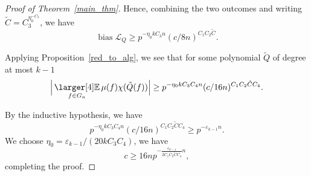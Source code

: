 \documentclass[a4paper,11pt]{article}
\theoremstyle{definition}
\newcommand{\on}[1]{
	\operatorname{#1}
}
\newcommand{\exx}{
  \mathop{
    \mathchoice{\vcenter{\hbox{\larger[4]$\mathbb{E}$}}}
               {\kern0pt\mathbb{E}}
               {\kern0pt\mathbb{E}}
               {\kern0pt\mathbb{E}}
  }\displaylimits
}
\begin{document}
\begin{proof}[Proof of Theorem~\ref{main_thm}]
    Hence, combining the two outcomes and writing $\tilde{C} = C_3^{\eta_0^{-C_3}}$, we have
    \[\on{bias} \mathcal{L}_Q \geq p^{- \eta_0kC_3 n}  (c/8n)^{C_1C_2\tilde{C}}.\]

    Applying Proposition~\ref{red_to_alg}, we see that for some polynomial $\tilde{Q}$ of degree at most $k - 1$
    \[\Big|\exx_{f\in G_n}\mu(f)\chi(\tilde{Q}(f))\Big| \geq p^{- \eta_0kC_3C_4 n} (c/16n)^{C_1C_2\tilde{C}C_4}.\]

    By the inductive hypothesis, we have 
    \[p^{- \eta_0kC_3C_4 n} (c/16n)^{C_1C_2\tilde{C}C_4} \geq p^{-\varepsilon_{k-1}n}.\]
    We choose $\eta_0 = \varepsilon_{k-1}/(20kC_3C_4)$, we have 
    \[c \geq 16 n  p^{-\frac{\varepsilon_{k-1}}{2C_1C_2\tilde{C}C_4}n},\]
    completing the proof.
\end{proof}
\end{document}
